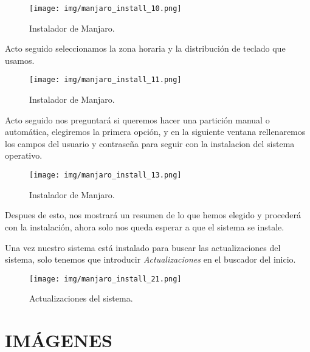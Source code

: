 \documentclass[12pt]{article}
\begin{document}
        \begin{figure}[h]
          \centering
          \texttt{[image: img/manjaro\_install\_10.png]}
          \caption{Instalador de Manjaro.}
          \label{Manjaro5}
        \end{figure}

        \newpage

        Acto seguido seleccionamos la zona horaria y la distribución de teclado que usamos.

        \begin{figure}[h]
          \centering
          \texttt{[image: img/manjaro\_install\_11.png]}
          \caption{Instalador de Manjaro.}
          \label{Manjaro6}
        \end{figure}

        Acto seguido nos preguntará si queremos hacer una partición manual o automática, elegiremos la 
        primera opción, y en la siguiente ventana rellenaremos los campos del usuario y contraseña para 
        seguir con la instalacion del sistema operativo.

        \begin{figure}[h]
          \centering
          \texttt{[image: img/manjaro\_install\_13.png]}
          \caption{Instalador de Manjaro.}
          \label{Manjaro7}
        \end{figure}

        Despues de esto, nos mostrará un resumen de lo que hemos elegido y procederá con la instalación, ahora 
        solo nos queda esperar a que el sistema se instale.

        \newpage 

        Una vez nuestro sistema está instalado para buscar las actualizaciones del sistema, solo tenemos que introducir 
        \textit{Actualizaciones} en el buscador del inicio.

        \begin{figure}[h]
          \centering
          \texttt{[image: img/manjaro\_install\_21.png]}
          \caption{Actualizaciones del sistema.}
          \label{Manjaro7}
        \end{figure}









      \newpage

      \section{IMÁGENES}
      \listoffigures
        
  
\end{document}
